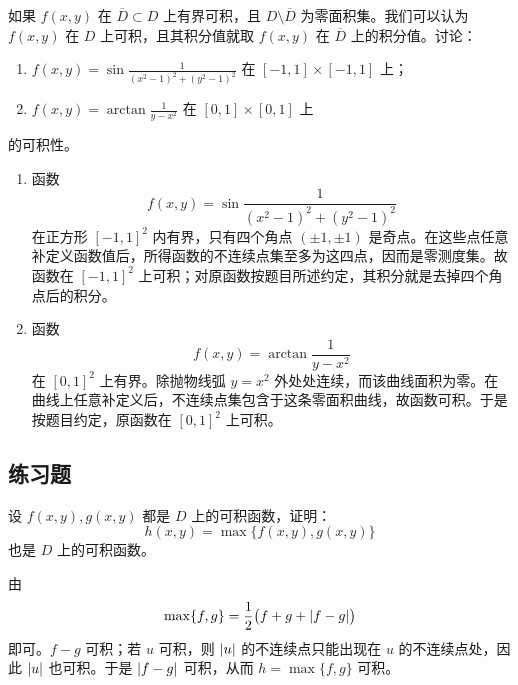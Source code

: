 \begin{xthought}[4]
如果 $f(x,y)$ 在 $\overline D\subset D$ 上有界可积，且 $D\setminus\overline D$ 为零面积集。我们可以认为 $f(x,y)$ 在 $D$ 上可积，且其积分值就取 $f(x,y)$ 在 $\overline D$ 上的积分值。讨论：
  \begin{enumerate}[label=(\arabic*)]
    \item $\displaystyle f(x,y)=\sin\frac1{(x^2-1)^2+(y^2-1)^2}$ 在 $[-1,1]\times[-1,1]$ 上；
    \item $\displaystyle f(x,y)=\arctan\frac1{y-x^2}$ 在 $[0,1]\times[0,1]$ 上
  \end{enumerate}
  的可积性。
\end{xthought}
\begin{xsolution}
\begin{enumerate}[label=(\arabic*)]
  \item 函数
  \[
    f(x,y)=\sin\frac1{(x^2-1)^2+(y^2-1)^2}
  \]
  在正方形 $[-1,1]^2$ 内有界，只有四个角点 $(\pm1,\pm1)$ 是奇点。在这些点任意补定义函数值后，所得函数的不连续点集至多为这四点，因而是零测度集。故函数在 $[-1,1]^2$ 上可积；对原函数按题目所述约定，其积分就是去掉四个角点后的积分。

  \item 函数
  \[
    f(x,y)=\arctan\frac1{y-x^2}
  \]
  在 $[0,1]^2$ 上有界。除抛物线弧 $y=x^2$ 外处处连续，而该曲线面积为零。在曲线上任意补定义后，不连续点集包含于这条零面积曲线，故函数可积。于是按题目约定，原函数在 $[0,1]^2$ 上可积。
\end{enumerate}
\end{xsolution}


\subsection{练习题}

\begin{xexercise}[1]
设 $f(x,y),g(x,y)$ 都是 $D$ 上的可积函数，证明：
  \[
    h(x,y)=\max\{f(x,y),g(x,y)\}
  \]
  也是 $D$ 上的可积函数。
\end{xexercise}
\begin{xsolution}
由
\[
  \max\{f,g\}=\frac12\bigl(f+g+\lvert f-g\rvert\bigr)
\]
即可。$f-g$ 可积；若 $u$ 可积，则 $\lvert u\rvert$ 的不连续点只能出现在 $u$ 的不连续点处，因此 $\lvert u\rvert$ 也可积。于是 $\lvert f-g\rvert$ 可积，从而 $h=\max\{f,g\}$ 可积。
\end{xsolution}


